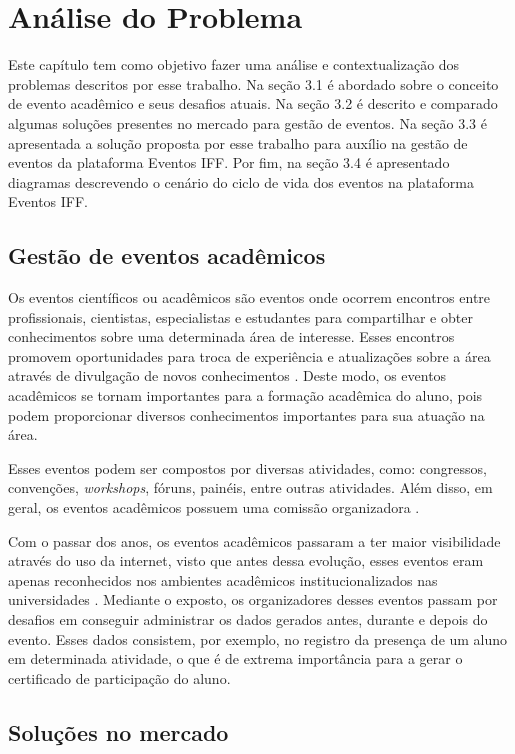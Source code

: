 \chapter{Análise do Problema}

Este capítulo tem como objetivo fazer uma análise e contextualização dos problemas descritos por esse trabalho. Na seção 3.1 é abordado sobre o conceito de evento acadêmico e seus desafios atuais. Na seção 3.2 é descrito e comparado algumas soluções presentes no mercado para gestão de eventos. Na seção 3.3 é apresentada a solução proposta por esse trabalho para auxílio na gestão de eventos da plataforma Eventos IFF. Por fim, na seção 3.4 é apresentado diagramas descrevendo o cenário do ciclo de vida dos eventos na plataforma Eventos IFF.

\section{Gestão de eventos acadêmicos}

Os eventos científicos ou acadêmicos são eventos onde ocorrem encontros entre profissionais, cientistas, especialistas e estudantes para compartilhar e obter conhecimentos sobre uma determinada área de interesse. Esses encontros promovem oportunidades para troca de experiência e atualizações sobre a área através de divulgação de novos conhecimentos \cite{lacerda}. Deste modo, os eventos acadêmicos se tornam importantes para a formação acadêmica do aluno, pois podem proporcionar diversos conhecimentos importantes para sua atuação na área.

Esses eventos podem ser compostos por diversas atividades, como: congressos, convenções, \textit{workshops}, fóruns, painéis, entre outras atividades. Além disso, em geral, os eventos acadêmicos possuem uma comissão organizadora \cite{araujo}.

Com o passar dos anos, os eventos acadêmicos passaram a ter maior visibilidade através do uso da internet, visto que antes dessa evolução, esses eventos eram apenas reconhecidos nos ambientes acadêmicos institucionalizados nas universidades \cite{araujo}. Mediante o exposto, os organizadores desses eventos passam por desafios em conseguir administrar os dados gerados antes, durante e depois do evento. Esses dados consistem, por exemplo, no registro da presença de um aluno em determinada atividade, o que é de extrema importância para a gerar o certificado de participação do aluno.

\section{Soluções no mercado}


